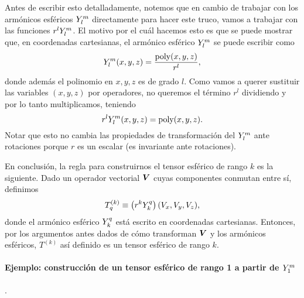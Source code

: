 \documentclass[10pt, a4paper]{article}
\numberwithin{equation}{subsection}
\begin{document}
Antes de escribir esto detalladamente, notemos que en cambio de trabajar con
los armónicos esféricos $\SphericalHarmonic{l}{m}$ directamente para hacer este
truco, vamos a trabajar con las funciones $r^l\SphericalHarmonic{l}{m}$. El
motivo por el cuál hacemos esto es que se puede mostrar que, en coordenadas
cartesianas, el armónico esférico $\SphericalHarmonic{l}{m}$ se puede escribir
como
\begin{equation}
  \SphericalHarmonic{l}{m}(x,y,z) = \frac{\text{poly}(x,y,z)}{r^l},
\end{equation}
donde además el polinomio en $x,y,z$ es de grado $l$. Como vamos a querer
sustituir las variables $(x,y,z)$ por operadores, no queremos el término $r^l$
dividiendo y por lo tanto multiplicamos, teniendo
\begin{equation}
  r^l\SphericalHarmonic{l}{m}(x,y,z) = \text{poly}(x,y,z).
\end{equation}
Notar que esto no cambia las propiedades de transformación del
$\SphericalHarmonic{l}{m}$ ante rotaciones porque $r$ es un escalar (es
invariante ante rotaciones).

En conclusión, la regla para construirnos el tensor esférico de rango $k$ es la
siguiente. Dado un operador vectorial $\vb*{V}$ cuyas componentes conmutan
entre sí, definimos
\begin{equation}
  T^{(k)}_{q} \eqdef \left(r^k\SphericalHarmonic{k}{q}\right)(V_x, V_y, V_z),
\end{equation}
donde el armónico esférico $\SphericalHarmonic{k}{q}$ está escrito en
coordenadas cartesianas. Entonces, por los argumentos antes dados de cómo
transforman $\vb*{V}$ y los armónicos esféricos, $T^{(k)}$ así definido es un
tensor esférico de rango $k$.

\paragraph{Ejemplo: construcción de un tensor esférico de rango 1 a partir de
  $\SphericalHarmonic{1}{m}$}.\\
\end{document}

